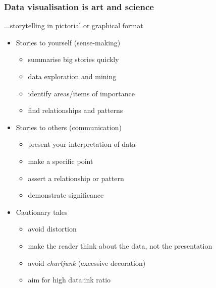 
\begin{frame}
  \frametitle{Data visualisation is art and science}
    $\ldots$storytelling in pictorial or graphical format \\
      \begin{itemize}  
        \item <1->\textcolor{hutton_green}{Stories to yourself (sense-making)}
        \begin{itemize}
          \item <2->summarise big stories quickly
          \item <2->data exploration and mining
          \item <2->identify areas/items of importance
          \item <2->find relationships and patterns
        \end{itemize}
        \item <1->\textcolor{hutton_blue}{Stories to others (communication)}
        \begin{itemize}
          \item <3->present your interpretation of data
          \item <3->make a specific point
          \item <3->assert a relationship or pattern
          \item <3->demonstrate significance
        \end{itemize}
        \item <1->\textcolor{hutton_purple}{Cautionary tales}
        \begin{itemize}
          \item <4->avoid distortion
          \item <4->make the reader think about the data, not the presentation
          \item <4->avoid \textit{chartjunk} (excessive decoration)
          \item <4->aim for high data:ink ratio
        \end{itemize}
      \end{itemize}  
\end{frame}


